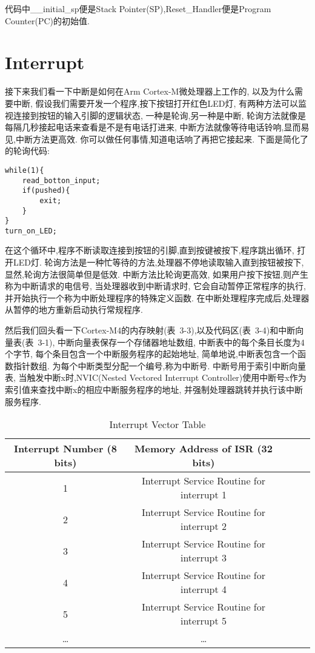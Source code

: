 代码中\_\_initial\_sp便是Stack Pointer(SP),Reset\_Handler便是Program Counter(PC)的初始值.


\section{Interrupt}
接下来我们看一下中断是如何在Arm Cortex-M微处理器上工作的,
以及为什么需要中断,
假设我们需要开发一个程序,按下按钮打开红色LED灯,
有两种方法可以监视连接到按钮的输入引脚的逻辑状态,
一种是轮询,另一种是中断,
轮询方法就像是每隔几秒接起电话来查看是不是有电话打进来,
中断方法就像等待电话铃响,显而易见,中断方法更高效.
你可以做任何事情,知道电话响了再把它接起来.
下面是简化了的轮询代码:

\begin{lstlisting}[language={[ANSI]C},keywordstyle=\color{blue!70},commentstyle=\color{red!50!green!50!blue!50},frame=shadowbox, rulesepcolor=\color{red!20!green!20!blue!20}]
while(1){
    read_botton_input;
    if(pushed){
        exit;
    }
}
turn_on_LED;
\end{lstlisting}

在这个循环中,程序不断读取连接到按钮的引脚,直到按键被按下,程序跳出循环,
打开LED灯.
轮询方法是一种忙等待的方法,处理器不停地读取输入直到按钮被按下,
显然,轮询方法很简单但是低效.
中断方法比轮询更高效,
如果用户按下按钮,则产生称为中断请求的电信号,
当处理器收到中断请求时,
它会自动暂停正常程序的执行,
并开始执行一个称为中断处理程序的特殊定义函数.
在中断处理程序完成后,处理器从暂停的地方重新启动执行常规程序.

然后我们回头看一下Cortex-M4的内存映射(表~3-3),以及代码区(表~3-4)和中断向量表(表~3-1),
中断向量表保存一个存储器地址数组,
中断表中的每个条目长度为4个字节,
每个条目包含一个中断服务程序的起始地址,
简单地说,中断表包含一个函数指针数组.
为每个中断类型分配一个编号,称为中断号. 
中断号用于索引中断向量表,
当触发中断x时,NVIC(Nested Vectored Interrupt Controller)使用中断号x作为索引值来查找中断x的相应中断服务程序的地址,
并强制处理器跳转并执行该中断服务程序.
\begin{table}[htbp]
    \caption{  Interrupt Vector Table }\label{tab:table1}
    \vspace{0.5em}\centering\wuhao
    \begin{tabular}{ccccc}
    \toprule[1.5pt]
    Interrupt Number (8 bits) & Memory Address of ISR (32 bits) \\
    \midrule[1pt]
    1    &      Interrupt Service Routine for interrupt 1 \\
    2    &      Interrupt Service Routine for interrupt 2 \\
    3    &      Interrupt Service Routine for interrupt 3 \\
    4    &      Interrupt Service Routine for interrupt 4 \\
    5    &      Interrupt Service Routine for interrupt 5 \\
    \dots &     \dots \\
  
    \bottomrule[1.5pt]
    \end{tabular}
    \vspace{\baselineskip}
    \end{table}

